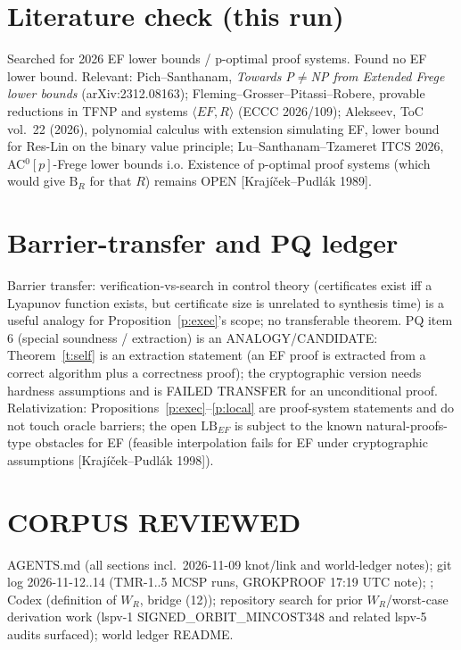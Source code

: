 \documentclass[11pt]{article}
\begin{document}
\section*{Literature check (this run)}
Searched for 2026 EF lower bounds / p-optimal proof systems. Found no EF lower
bound. Relevant: Pich--Santhanam, \emph{Towards P$\ne$NP from Extended Frege
lower bounds} (arXiv:2312.08163); Fleming--Grosser--Pitassi--Robere, provable
reductions in TFNP and systems $\langle EF,R\rangle$ (ECCC 2026/109);
Alekseev, ToC vol.\ 22 (2026), polynomial calculus with extension simulating
EF, lower bound for Res-Lin on the binary value principle;
Lu--Santhanam--Tzameret ITCS 2026, AC$^0[p]$-Frege lower bounds i.o.
Existence of p-optimal proof systems (which would give $\mathrm B_R$ for that
$R$) remains OPEN [Krajíček--Pudlák 1989].

\section*{Barrier-transfer and PQ ledger}
Barrier transfer: verification-vs-search in control theory (certificates
exist iff a Lyapunov function exists, but certificate size is unrelated to
synthesis time) is a useful analogy for Proposition~\ref{p:exec}'s scope; no
transferable theorem. PQ item 6 (special soundness / extraction) is an
ANALOGY/CANDIDATE: Theorem~\ref{t:self} is an extraction statement (an EF proof
is extracted from a correct algorithm plus a correctness proof); the
cryptographic version needs hardness assumptions and is FAILED TRANSFER for an
unconditional proof. Relativization: Propositions~\ref{p:exec}--\ref{p:local}
are proof-system statements and do not touch oracle barriers; the open
$\mathrm{LB}_{EF}$ is subject to the known natural-proofs-type obstacles for
EF (feasible interpolation fails for EF under cryptographic assumptions
[Krajíček--Pudlák 1998]).

\section*{CORPUS REVIEWED}
AGENTS.md (all sections incl.\ 2026-11-09 knot/link and world-ledger notes);
git log 2026-11-12..14 (TMR-1..5 MCSP runs, GROKPROOF 17:19 UTC note);
;
Codex 
(definition of $W_R$, bridge (12)); repository search for prior
$W_R$/worst-case derivation work (lspv-1 SIGNED\_ORBIT\_MINCOST348 and
related lspv-5 audits surfaced); world ledger README.
\end{document}
